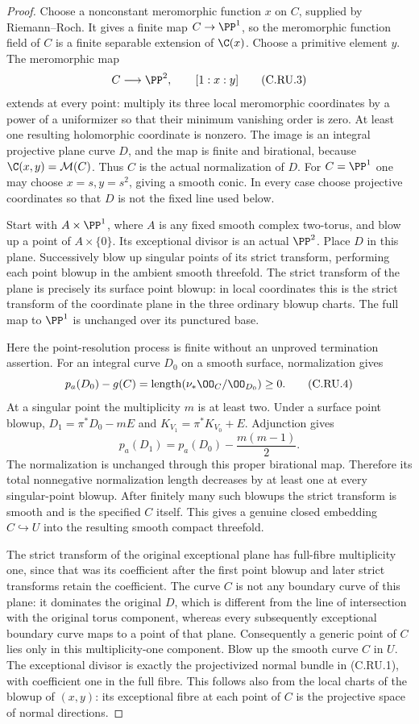 \begin{proof}
Choose a nonconstant meromorphic function $x$ on $C$, supplied by
Riemann--Roch. It gives a finite map $C\to\PP^1$, so the meromorphic
function field of $C$ is a finite separable extension of $\C(x)$.
Choose a primitive element $y$. The meromorphic map
\[
                    C\longrightarrow\PP^2,\qquad [1:x:y]
\tag{C.RU.3}
\]
extends at every point: multiply its three local meromorphic coordinates
by a power of a uniformizer so that their minimum vanishing order is zero.
At least one resulting holomorphic coordinate is nonzero. The image is an
integral projective plane curve $D$, and the map is finite and birational,
because $\C(x,y)=\mathcal M(C)$. Thus $C$ is the actual normalization of
$D$. For $C=\PP^1$ one may choose $x=s,y=s^2$, giving a smooth conic.
In every case choose projective coordinates so that $D$ is not the fixed
line used below.

Start with $A\times\PP^1$, where $A$ is any fixed smooth complex two-torus,
and blow up a point of $A\times\{0\}$. Its exceptional divisor is an
actual $\PP^2$. Place $D$ in this plane. Successively blow up singular
points of its strict transform, performing each point blowup in the
ambient smooth threefold. The strict transform of the plane is precisely
its surface point blowup: in local coordinates this is the strict
transform of the coordinate plane in the three ordinary blowup charts.
The full map to $\PP^1$ is unchanged over its punctured base.

Here the point-resolution process is finite without an unproved
termination assertion. For an integral curve $D_0$ on a smooth surface,
normalization gives
\[
  p_a(D_0)-g(C)=\operatorname{length}
                (\nu_*\OO_C/\OO_{D_0})\ge0.
\tag{C.RU.4}
\]
At a singular point the multiplicity $m$ is at least two. Under a surface
point blowup, $D_1=\pi^*D_0-mE$ and
$K_{V_1}=\pi^*K_{V_0}+E$. Adjunction gives
\[
                        p_a(D_1)=p_a(D_0)-\frac{m(m-1)}2.
\tag{C.RU.5}
\]
The normalization is unchanged through this proper birational map.
Therefore its total nonnegative normalization length decreases by at
least one at every singular-point blowup. After finitely many such
blowups the strict transform is smooth and is the specified $C$ itself.
This gives a genuine closed embedding $C\hookrightarrow U$ into the
resulting smooth compact threefold.

The strict transform of the original exceptional plane has full-fibre
multiplicity one, since that was its coefficient after the first point
blowup and later strict transforms retain the coefficient. The curve
$C$ is not any boundary curve of this plane: it dominates the original
$D$, which is different from the line of intersection with the original
torus component, whereas every subsequently exceptional boundary curve
maps to a point of that plane. Consequently a generic point of $C$ lies
only in this multiplicity-one component. Blow up the smooth curve $C$ in
$U$. The exceptional divisor is exactly the projectivized normal bundle
in (C.RU.1), with coefficient one in the full fibre. This follows also
from the local charts of the blowup of $(x,y)$: its exceptional fibre at
each point of $C$ is the projective space of normal directions.


\end{proof}
